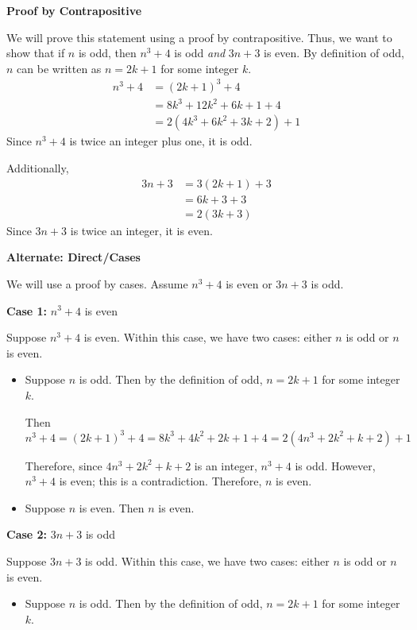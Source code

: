\documentclass[12pt]{exam}
\begin{document}
\begin{solution}
\textbf{Proof by Contrapositive}

\noindent We will prove this statement using a proof by contrapositive. Thus, we want to show that if $n$ is odd, then $n^3 + 4$ is odd \textit{and} $3n + 3$ is even. By definition of odd, $n$ can be written as $n=2k+1$ for some integer $k.$
\begin{align*}
    n^3 + 4 &= (2k+1)^3 + 4\\
        &= 8k^3 + 12k^2 + 6k + 1 + 4\\
        &= 2(4k^3 + 6k^2 + 3k + 2) + 1
\end{align*}
Since $n^3+4$ is twice an integer plus one, it is odd.

Additionally,
\begin{align*}
    3n + 3 &= 3(2k+1) + 3\\
        &= 6k + 3 + 3\\
        &= 2(3k + 3)
\end{align*}
Since $3n+3$ is twice an integer, it is even.

\smallskip

\smallskip

\textbf{Alternate: Direct/Cases}

We will use a proof by cases. Assume $n^3+4$ is even or $3n+3$ is odd.

\textbf{Case 1:} $n^3+4$ is even

Suppose $n^3+4$ is even. Within this case, we have two cases: either $n$ is odd or $n$ is even.

\begin{itemize}
    \item Suppose $n$ is odd. Then by the definition of odd, $n=2k+1$ for some integer $k$. 

    Then $n^3+4=(2k+1)^3+4=8k^3+4k^2+2k+1+4=2(4n^3+2k^2+k+2)+1$

    Therefore, since $4n^3+2k^2+k+2$ is an integer, $n^3+4$ is odd. However, $n^3+4$ is even; this is a contradiction. Therefore, $n$ is even.
\item 
    Suppose $n$ is even. Then $n$ is even.
\end{itemize}

\textbf{Case 2:} $3n+3$ is odd

Suppose $3n+3$ is odd. Within this case, we have two cases: either $n$ is odd or $n$ is even. 

\begin{itemize}
    \item Suppose $n$ is odd. Then by the definition of odd, $n=2k+1$ for some integer $k$. 


\end{itemize}
\end{solution}
\end{document}
